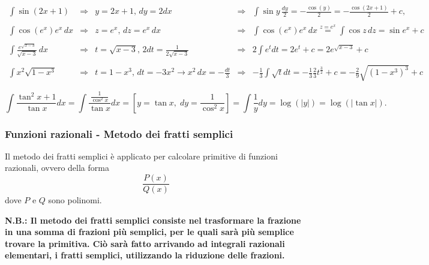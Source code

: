 \begin{example}
    \begin{equation*}
        \begin{matrix}
            \int\sin(2x+1)&\Rightarrow
            & y=2x+1,\, dy=2dx &\Rightarrow&\int\sin y\, \frac{dy}{2}=-\frac{\cos(y)}{2}=-\frac{\cos(2x+1)}{2}+c,\\\\
            \int \cos(e^x)e^x\,dx &\Rightarrow & z=e^x,\, dz=e^x\, dx &\Rightarrow& \int\cos(e^x) e^x\, dx \overset{z=e^x}{=}\int\cos z\, dz= \sin e^x+c\\\\
            \int\frac{e^{\sqrt{x-3}}}{\sqrt{x-3}}\, dx &\Rightarrow& t=\sqrt{x-3},\, 2dt=\frac{1}{2\sqrt{x-3}} &\Rightarrow& 2 \int e^t dt =  2 e^t+c = 2e^{\sqrt{x-3}} + c\\\\
            \int x^2\sqrt{1-x^3} &\Rightarrow& t = 1-x^3,\, dt=-3x^2\rightarrow x^2\, dx= -\frac{dt}{3} &\Rightarrow& -\frac{1}{3}\int\sqrt{t} dt = -\frac{1}{3}\frac{2}{3}t^{\frac{3}{2}}+c =  -\frac{2}{9}\sqrt{(1-x^3)^3}+ c
        \end{matrix}
    \end{equation*}
\end{example}

\begin{example}
    \begin{equation*}
        \int\frac{\tan^2x+1}{\tan x}dx = \int \frac{\frac{1}{\cos^2x}}{\tan x} dx = \left[y = \tan x,\; dy = \frac{1}{\cos^2x} \right] = \int \frac{1}{y}dy = \log(|y|) = \log(|\tan x|).
    \end{equation*}
\end{example}

\subsubsection{Funzioni razionali - Metodo dei fratti semplici}
Il metodo dei fratti semplici è applicato per calcolare primitive di funzioni razionali, ovvero della forma
\begin{equation}\label{eq:funzione_razionale}
    \frac{P(x)}{Q(x)}
\end{equation}
dove $P$ e $Q$ sono \gls{polinomi}. 

\textbf{N.B.: Il metodo dei fratti semplici consiste nel trasformare la frazione in una somma di frazioni più semplici, per le quali sarà più semplice trovare la primitiva. Ciò sarà fatto arrivando ad integrali razionali elementari, i fratti semplici, utilizzando la riduzione delle frazioni.}

